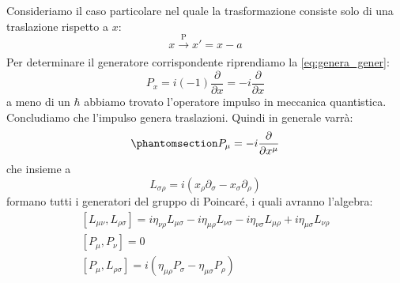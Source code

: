 Consideriamo il caso particolare nel quale la trasformazione consiste solo di una traslazione rispetto a $x$:
\begin{equation}
  x\xrightarrow[\text{}]{\text{P}}x'=x-a
\end{equation}
Per determinare il generatore corrispondente riprendiamo la \eqref{eq:genera_gener}:
\begin{equation}
  P_x=i(-1)\dfrac{\partial}{\partial x}=-i\dfrac{\partial}{\partial x}
\end{equation}
 a meno di un $\hbar$ abbiamo trovato l'operatore impulso in meccanica quantistica. Concludiamo che l'impulso genera traslazioni. Quindi in generale varrà:
 \begin{equation}\phantomsection\label{eq:op_poincare}
  P_\mu=-i\dfrac{\partial}{\partial x^\mu}
\end{equation}
che insieme a 
\begin{equation}
 L{_{\sigma\rho}}= i(x_\rho\partial_\sigma-x_\sigma\partial_\rho)
\end{equation}
formano tutti i generatori del gruppo di Poincaré, i quali avranno l'algebra:
\begin{equation}
\begin{gathered}
        \left[L_{\mu \nu},L_{\rho \sigma}\right]=i\eta_{\nu \rho}L_{\mu \sigma}-i\eta_{\mu \rho}L_{\nu \sigma}-i\eta_{\nu \sigma}L_{\mu \rho}+i\eta_{\mu \sigma}L_{\nu \rho}\\
        \left[P_{\mu},P_\nu\right]=0\\
        \left[P_\mu,L_{\rho \sigma}\right]=i(\eta_{\mu \rho}P_\sigma-\eta_{\mu \sigma}P_\rho)
\end{gathered}
\end{equation}